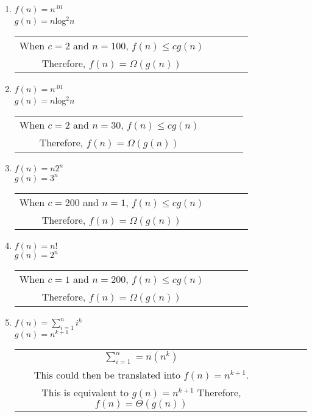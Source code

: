 \documentclass{article}
\begin{document}
\begin{enumerate}[label=(\alph*)]
\item \addtocounter{enumi}{1} $f(n)=n^{.01}$
\\ $g(n)=n$log$^2n$
	\begin{center}
    	\begin{tabular} {c c c c c}
        	When $c=2$ and $n=100$, $f(n)\leq cg(n)$\\
            Therefore, $f(n)=\Omega(g(n))$\\
        \end{tabular}
	\end{center}
\item \addtocounter{enumi}{1}  $f(n)=n^{.01}$
\\ $g(n)=n$log$^2n$
	\begin{center}
    	\begin{tabular} {c c c c c}
        	When $c=2$ and $n=30$, $f(n)\leq cg(n)$\\
            Therefore, $f(n)=\Omega(g(n))$\\
        \end{tabular}
	\end{center}

\item \addtocounter{enumi}{1}$f(n)=n2^{n}$
\\ $g(n)=3^{n}$
	\begin{center}
    	\begin{tabular} {c c c c c}
        	When $c=200$ and $n=1$, $f(n)\leq cg(n)$\\
            Therefore, $f(n)=\Omega(g(n))$\\
        \end{tabular}
	\end{center}

\item \addtocounter{enumi}{1}$f(n)=n!$
\\ $g(n)=2^n$
	\begin{center}
    	\begin{tabular} {c c c c c}
        	When $c=1$ and $n=200$, $f(n)\leq cg(n)$\\
            Therefore, $f(n)=\Omega(g(n))$\\
        \end{tabular}
	\end{center}
\item \addtocounter{enumi}{1} $f(n)=\sum_{i=1}^{n} i^{k}$
\\ $g(n)=n^{k+1}$
	\begin{center}
    	\begin{tabular} {c c c c c}
        	$\sum_{i=1}^{n}=n(n^{k})$\\
            This could then be translated into $f(n)=n^{k+1}$.\\
            This is equivalent to $g(n)=n^{k+1}$
            Therefore, $f(n)=\Theta(g(n))$\\
        \end{tabular}
	\end{center}
\end{enumerate}
\end{document}
